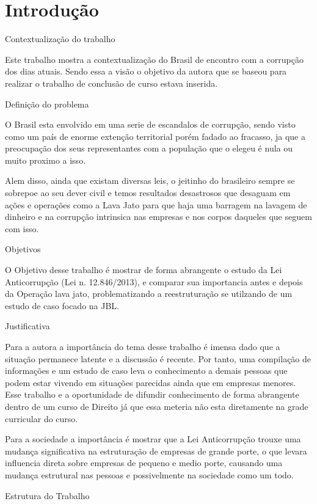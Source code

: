 \chapter[Introdução]{Introdução}
\label{chap:introducao}


Contextualização do trabalho

Este trabalho mostra a contextualização do Brasil de encontro com a corrupção dos dias atuais. Sendo essa a visão o objetivo da autora que se baseou para realizar o trabalho de conclusão de curso estava inserida. 


Definição do problema

O Brasil esta envolvido em uma serie de escandalos de corrupção, sendo visto como um país de enorme extenção territorial porém fadado ao fracasso, ja que a preocupação dos seus representantes com a população que o elegeu é nula ou muito proximo a isso. 

Alem disso, ainda que existam diversas leis, o jeitinho do brasileiro sempre se sobrepoe ao seu dever civil e temos resultados desastrosos que desaguam em ações e operações como a Lava Jato para que haja uma barragem na lavagem de dinheiro e na corrupção intrinsica nas empresas e nos corpos daqueles que seguem com isso. 


Objetivos


O Objetivo desse trabalho é mostrar de forma abrangente o estudo da Lei Anticorrupção (Lei n. 12.846/2013), e comparar sua importancia antes e depois da Operação lava jato, problematizando a reestruturação se utilzando de um estudo de caso focado na JBL. 


Justificativa


Para a autora a importância do tema desse trabalho é imensa dado que a situação permanece latente e a discussão é recente. Por tanto, uma compilação de informações e um estudo de caso leva o conhecimento a demais pessoas que podem estar vivendo em situações parecidas ainda que em empresas menores. Esse trabalho e a oportunidade de difundir conhecimento de forma abrangente dentro de um curso de Direito já que essa meteria não esta diretamente na grade curricular do curso. 

Para a sociedade a importância é mostrar que a Lei Anticorrupção trouxe uma mudança significativa na estruturação de empresas de grande porte, o que levara influencia direta sobre empresas de pequeno e medio porte, causando uma mudança estrutural nas pessoas e possivelmente na sociedade como um todo. 

Estrutura do Trabalho


